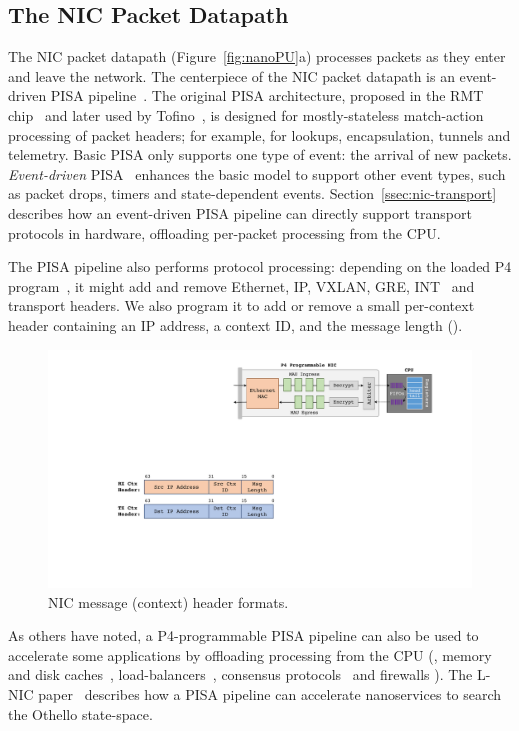 \subsection{The NIC Packet Datapath}
\label{ssec:nic-datapath}
The NIC packet datapath (Figure~\ref{fig:nanoPU}a) processes packets as they enter and leave the network.
The centerpiece of the NIC packet datapath is an event-driven PISA pipeline~\cite{event-driven-pisa}. 
The original PISA architecture, proposed in the RMT chip~\cite{RMT} and later used by Tofino~\cite{tofino}, is designed for mostly-stateless match-action processing of packet headers; for example, for lookups, encapsulation, tunnels and telemetry.
Basic PISA only supports one type of event: the arrival of new packets. 
{\em Event-driven} PISA~\cite{event-driven-pisa} enhances the basic model to support other event types, such as packet drops, timers and state-dependent events. 
Section~\ref{ssec:nic-transport} describes how an event-driven PISA pipeline can directly support transport protocols in hardware, offloading per-packet processing from the CPU. 

The PISA pipeline also performs protocol processing: depending on the loaded P4 program~\cite{P4}, it might add and remove Ethernet, IP, VXLAN, GRE, INT~\cite{INT} and transport headers. 
We also program it to add or remove a small per-context header containing an IP address, a context ID, and the message length ().

\begin{figure}
 \includegraphics[width=0.95\linewidth]{./figures/ctx-hdr-fmt}
 \caption{NIC message (context) header formats.}
 \label{fig:app-headers}
\end{figure}

As others have noted, a P4-programmable PISA pipeline can also be used to accelerate some applications by offloading processing from the CPU (\eg, memory and disk caches~\cite{netcache}, load-balancers~\cite{silkroad}, consensus protocols~\cite{netchain} and firewalls \cite{p4-firewall}). 
The L-NIC paper~\cite{lnic} describes how a PISA pipeline can accelerate nanoservices to search the Othello state-space.
